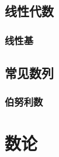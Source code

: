 \documentclass[a4paper]{article}
\begin{document}
\begin{multicols}{2}
			\subsection{线性代数}






				\subsubsection{线性基}






			
				
			\subsection{常见数列}
				\subsubsection{伯努利数}
					


		\section{数论}


\end{multicols}
\end{document}
